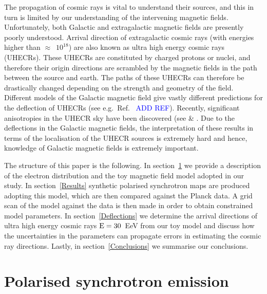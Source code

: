 \documentclass[usenatbib]{mnras}
\begin{document}
The propagation of cosmic rays is vital to understand their sources, and this in turn is limited by our understanding of the intervening magnetic fields. Unfortunately, both Galactic and extragalactic magnetic fields are presently poorly understood. Arrival direction of extragalactic cosmic rays (with energies higher than $\approx$~$10^{18}$) are also known as ultra high energy cosmic rays (UHECRs). These UHECRs are constituted by charged protons or nuclei, and therefore their origin directions are scrambled by the magnetic fields in the path between the source and earth. The paths of these UHECRs can therefore be drastically changed depending on the strength and geometry of the field. Different models of the Galactic magnetic field give vastly different predictions for the deflection of UHECRs (see e.g.~Ref.~ \cite{FARRAR_2014} \textcolor{blue}{ADD REF}). Recently, significant anisotropies in the UHECR sky have been discovered (see \cite{ICRC_2021} \cite{Auger_Starburst2018} \& \cite{ICRC_2019}. Due to the deflections in the Galactic magnetic fields, the interpretation of these results in terms of the localisation of the UHECR sources is extremely hard and hence, knowledge of Galactic magnetic fields is extremely important. 



The structure of this paper is the following. In section~\ref{Methods} we provide a description of the electron distribution and the toy magnetic field model adopted in our study. In section~\ref{Results} synthetic polarised synchrotron maps are produced adopting this model, which are then compared against the Planck data. A grid scan of the model against the data is then made in order to obtain constrained model parameters. In section~\ref{Deflections} we determine the arrival directions of ultra high energy cosmic rays $\rm E = 30$~EeV from our toy model and discuss how the uncertainties in the parameters can propagate errors in estimating the cosmic ray directions. %
Lastly, in section~\ref{Conclusions} we summarise our conclusions.


\section{Polarised synchrotron emission}
\label{Methods}
\end{document}

